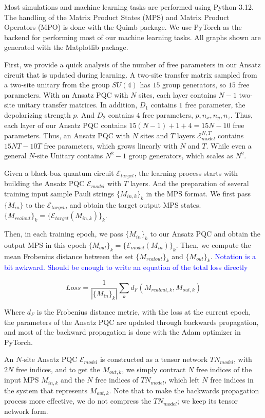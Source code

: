\documentclass[%
 reprint,
superscriptaddress,
 amsmath,amssymb,
 aps,
]{revtex4-2}
\newcommand{\E}{\mathcal{E}}
\newcommand{\yijian}[1]{\textcolor{blue}{#1}}
\begin{document}
Most simulations and machine learning tasks are performed using Python 3.12. The handling of the Matrix Product States (MPS) and Matrix Product Operators (MPO) is done with the Quimb package. We use PyTorch as the backend for performing most of our machine learning tasks. All graphs shown are generated with the Matplotlib package. 

First, we provide a quick analysis of the number of free parameters in our Ansatz circuit that is updated during learning. A two-site transfer matrix sampled from a two-site unitary from the group $SU(4)$ has $15$ group generators, so $15$ free parameters. With an Ansatz PQC with $N$ sites, each layer contains $N-1$ two-site unitary transfer matrices. In addition, $D_1$ contains $1$ free parameter, the depolarizing strength $p$. And $D_2$ contains $4$ free parameters, $p, n_x, n_y, n_z$. Thus, each layer of our Ansatz PQC contains $15(N-1)+1+4=15N-10$ free parameters. Thus, an Ansatz PQC with $N$ sites and $T$ layers $\E_{model}^{N, T}$ contains $15NT-10T$ free parameters, which grows linearly with $N$ and $T$. While even a general $N$-site Unitary contains $N^2-1$ group generators, which scales as $N^2$.

Given a black-box quantum circuit $\E_{target}$, the learning process starts with building the Ansatz PQC $\E_{model}$ with $T$ layers. And the preparation of several training input sample Pauli strings $\{M_{in, k}\}_k$ in the MPS format. We first pass $\{M_{in}\}$ to the $\E_{target}$, and obtain the target output MPS states. $\{M_{realout}\}_k = \{\E_{target}(M_{in, k})\}_k$. 

Then, in each training epoch, we pass $\{M_{in}\}_k$ to our Ansatz PQC and obtain the output MPS in this epoch $\{M_{out}\}_k = \{\E_{model}(M_{in})\}_k$. Then, we compute the mean Frobenius distance between the set $\{M_{realout}\}_k$ and $\{M_{out}\}_k$. \yijian{Notation is a bit awkward. Should be enough to write an equation of the total loss directly}

\begin{equation}
    Loss = \frac{1}{|\{M_{in}\}_k|}\sum_k d_F\left(M_{realout, k}, M_{out, k}\right)
\end{equation}

Where $d_F$ is the Frobenius distance metric, with the loss at the current epoch, the parameters of the Ansatz PQC are updated through backwards propagation, and most of the backward propagation is done with the Adam optimizer in PyTorch.

An $N$-site Ansatz PQC $\E_{model}$ is constructed as a tensor network $TN_{model}$, with $2N$ free indices, and to get the $M_{out, k}$, we simply contract $N$ free indices of the input MPS $M_{in, k}$ and the $N$ free indices of $TN_{model}$, which left $N$ free indices in the system that represents $M_{out, k}$. Note that to make the backwards propagation process more effective, we do not compress the $TN_{model}$; we keep its tensor network form. 
\end{document}
